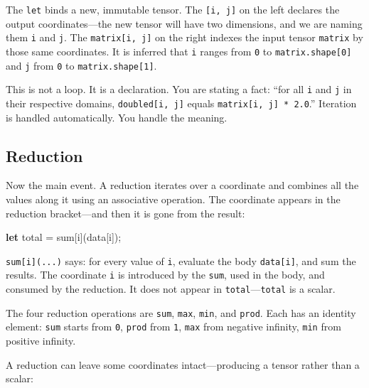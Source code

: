 \documentclass[11pt,titlepage]{article}
\newenvironment{Shaded}{}{}
\newcommand{\KeywordTok}[1]{\textcolor[rgb]{0.00,0.44,0.13}{\textbf{#1}}}
\newcommand{\NormalTok}[1]{#1}
\newcommand{\OperatorTok}[1]{\textcolor[rgb]{0.40,0.40,0.40}{#1}}
\begin{document}
The \texttt{let} binds a new, immutable tensor. The \texttt{{[}i,\ j{]}}
on the left declares the output coordinates---the new tensor will have
two dimensions, and we are naming them \texttt{i} and \texttt{j}. The
\texttt{matrix{[}i,\ j{]}} on the right indexes the input tensor
\texttt{matrix} by those same coordinates. It is inferred that
\texttt{i} ranges from \texttt{0} to \texttt{matrix.shape{[}0{]}} and
\texttt{j} from \texttt{0} to \texttt{matrix.shape{[}1{]}}.

This is not a loop. It is a declaration. You are stating a fact: ``for
all \texttt{i} and \texttt{j} in their respective domains,
\texttt{doubled{[}i,\ j{]}} equals \texttt{matrix{[}i,\ j{]}\ *\ 2.0}.''
Iteration is handled automatically. You handle the meaning.

\vspace{2em}

\hypertarget{reduction}{%
\subsection{Reduction}\label{reduction}}

Now the main event. A reduction iterates over a coordinate and combines
all the values along it using an associative operation. The coordinate
appears in the reduction bracket---and then it is gone from the result:

\begin{Shaded}
\begin{Highlighting}[]
\KeywordTok{let}\NormalTok{ total = sum}\OperatorTok{[}\NormalTok{i}\OperatorTok{]}\NormalTok{(data}\OperatorTok{[}\NormalTok{i}\OperatorTok{]}\NormalTok{);}
\end{Highlighting}
\end{Shaded}

\texttt{sum{[}i{]}(...)} says: for every value of \texttt{i}, evaluate
the body \texttt{data{[}i{]}}, and sum the results. The coordinate
\texttt{i} is introduced by the \texttt{sum}, used in the body, and
consumed by the reduction. It does not appear in
\texttt{total}---\texttt{total} is a scalar.

The four reduction operations are \texttt{sum}, \texttt{max},
\texttt{min}, and \texttt{prod}. Each has an identity element:
\texttt{sum} starts from \texttt{0}, \texttt{prod} from \texttt{1},
\texttt{max} from negative infinity, \texttt{min} from positive
infinity.

A reduction can leave some coordinates intact---producing a tensor
rather than a scalar:
\end{document}
